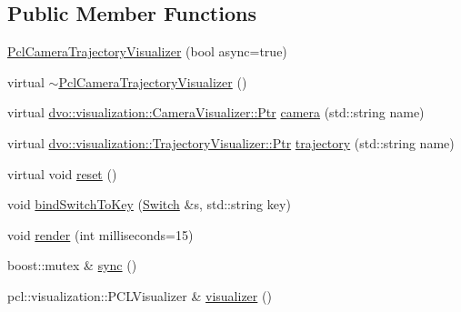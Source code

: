 \subsection*{Public Member Functions}
\begin{DoxyCompactItemize}
\item 
\mbox{\hyperlink{classdvo_1_1visualization_1_1_pcl_camera_trajectory_visualizer_a9edc1a2e72987b2dcdf9493c087817cc}{Pcl\+Camera\+Trajectory\+Visualizer}} (bool async=true)
\item 
virtual \mbox{\hyperlink{classdvo_1_1visualization_1_1_pcl_camera_trajectory_visualizer_a541a106d21f43f3ce4d108bff79c64ea}{$\sim$\+Pcl\+Camera\+Trajectory\+Visualizer}} ()
\item 
virtual \mbox{\hyperlink{classdvo_1_1visualization_1_1_camera_visualizer_a473ebecc62e1d4edba21027d858789a2}{dvo\+::visualization\+::\+Camera\+Visualizer\+::\+Ptr}} \mbox{\hyperlink{classdvo_1_1visualization_1_1_pcl_camera_trajectory_visualizer_af808188bb664cdaac442f79fe67b40a6}{camera}} (std\+::string name)
\item 
virtual \mbox{\hyperlink{classdvo_1_1visualization_1_1_trajectory_visualizer_aac33ef5979fe64ee33409f1afa977fd3}{dvo\+::visualization\+::\+Trajectory\+Visualizer\+::\+Ptr}} \mbox{\hyperlink{classdvo_1_1visualization_1_1_pcl_camera_trajectory_visualizer_ad0ea0d8feefef54cd5dc15cd483b3610}{trajectory}} (std\+::string name)
\item 
virtual void \mbox{\hyperlink{classdvo_1_1visualization_1_1_pcl_camera_trajectory_visualizer_a1dd833071b1343a97c0366d3ced0799b}{reset}} ()
\item 
void \mbox{\hyperlink{classdvo_1_1visualization_1_1_pcl_camera_trajectory_visualizer_a7db9ae0e3abc85bcb8a5259df501154c}{bind\+Switch\+To\+Key}} (\mbox{\hyperlink{structdvo_1_1visualization_1_1_switch}{Switch}} \&s, std\+::string key)
\item 
void \mbox{\hyperlink{classdvo_1_1visualization_1_1_pcl_camera_trajectory_visualizer_a4d11076029980fdf3492da7eb304fe6a}{render}} (int milliseconds=15)
\item 
boost\+::mutex \& \mbox{\hyperlink{classdvo_1_1visualization_1_1_pcl_camera_trajectory_visualizer_a314dca78e0ea3b86e59dc9953bfd59f0}{sync}} ()
\item 
pcl\+::visualization\+::\+P\+C\+L\+Visualizer \& \mbox{\hyperlink{classdvo_1_1visualization_1_1_pcl_camera_trajectory_visualizer_a29266bd96578573e145d97d2574abd78}{visualizer}} ()
\end{DoxyCompactItemize}


